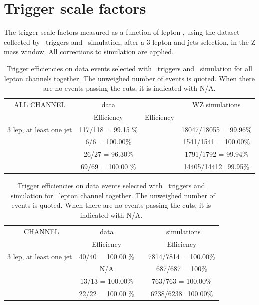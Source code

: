 

\chapter{Trigger scale factors}
\label{app:TriggerSF}



The trigger scale factors measured as a function of lepton \pt, using the dataset collected by \Etmis\ triggers and \WZ\ simulation, after a 3 lepton and jets selection, in the Z mass window. All corrections to simulation are applied.



\begin{table}[htbp]
	\centering
	\caption{Trigger efficiencies on data events selected with \Etmis\ triggers and \WZ\ simulation for all lepton channels together. The unweighed number of events is quoted. When there are no events passing the cuts, it is indicated with N/A. }
	\begin{tabular}{cccc}
		\toprule
		ALL CHANNEL & {data} & &{WZ simulations} \\ 
		& Efficiency  & Efficiency  \\
		\midrule 
		3 lep,  at least one jet & 117/118 = 99.15 \% &  & 18047/18055 = 99.96\%  \\ 
		\hline 
		\STSR & 6/6 = 100.00\% & & 1541/1541 = 100.00\% \\ 
		\hline 
		\TTSR & 26/27 = 96.30\% & & 1791/1792 = 99.94\%  \\ 
		\hline 
		\WZCR & 69/69 = 100.00 \% &  & 14405/14412=99.95\%  \\ 
		\bottomrule 
	\end{tabular} 
\end{table}	
\begin{table}[htbp]
	\centering
	\caption{Trigger efficiencies on data events selected with \Etmis\ triggers and \WZ\ simulation for \mumumu\ lepton channel together. The unweighed number of events is quoted. When there are no events passing the cuts, it is indicated with N/A. }
	\begin{tabular}{cccc}
		\toprule 
		\mumumu\ CHANNEL & {data} & &{\WZ\ simulations} \\
		& Efficiency &  & Efficiency  \\ 
		\midrule 
		3 lep,  at least one jet & 40/40 = 100.00 \% &  & 7814/7814 = 100.00\%   \\ 
		\hline 
		\STSR & N/A &  & 687/687 = 100\% \\ 
		\hline 
		\TTSR & 13/13 = 100.00\% &  &763/763 = 100.00\% \\ 
		\hline 
		\WZCR & 22/22 = 100.00 \% &  & 6238/6238=100.00\% \\ 
		\bottomrule
	\end{tabular} 
\end{table}	
